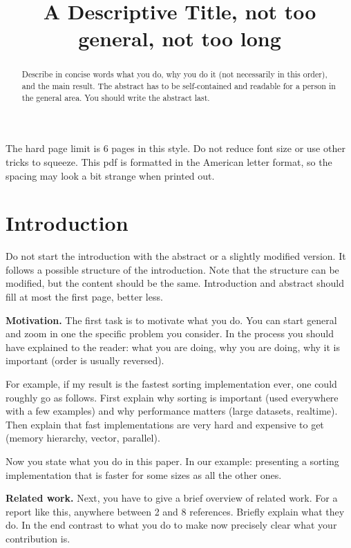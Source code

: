 \documentclass[letterpaper]{article}
\title{A Descriptive Title, not too general, not too long}
\newcommand{\mypar}[1]{{\bf #1.}}
\begin{document}
%
\maketitle
%

The hard page limit is 6 pages in this style. Do not reduce font size
or use other tricks to squeeze. This pdf is formatted in the American letter format, so the spacing may look a bit strange when printed out.

\begin{abstract}
Describe in concise words what you do, why you do it (not necessarily
in this order), and the main result.  The abstract has to be
self-contained and readable for a person in the general area. You
should write the abstract last.
\end{abstract}

\section{Introduction}\label{sec:intro}

Do not start the introduction with the abstract or a slightly modified
version. It follows a possible structure of the introduction. 
Note that the structure can be modified, but the
content should be the same. Introduction and abstract should fill at most the first page, better less.

\mypar{Motivation} The first task is to motivate what you do.  You can
start general and zoom in one the specific problem you consider.  In
the process you should have explained to the reader: what you are doing,
why you are doing, why it is important (order is usually reversed).

For example, if my result is the fastest sorting implementation ever, one
could roughly go as follows. First explain why sorting is important
(used everywhere with a few examples) and why performance matters (large datasets,
realtime). Then explain that fast implementations are very hard and
expensive to get (memory hierarchy, vector, parallel). 

Now you state what you do in this paper. In our example: 
presenting a sorting implementation that is
faster for some sizes as all the other ones.

\mypar{Related work} Next, you have to give a brief overview of
related work. For a report like this, anywhere between 2 and 8
references. Briefly explain what they do. In the end contrast to what
you do to make now precisely clear what your contribution is.
\end{document}
